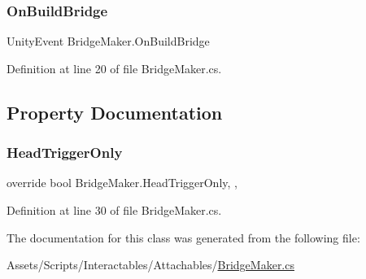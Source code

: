 \subsubsection{\texorpdfstring{On\+Build\+Bridge}{OnBuildBridge}}
{\footnotesize\ttfamily Unity\+Event Bridge\+Maker.\+On\+Build\+Bridge}



Definition at line 20 of file Bridge\+Maker.\+cs.



\subsection{Property Documentation}
\mbox{\label{class_bridge_maker_ae19669b24ef7131ae7d9bfe8fc9f72cf}} 
\subsubsection{\texorpdfstring{Head\+Trigger\+Only}{HeadTriggerOnly}}
{\footnotesize\ttfamily override bool Bridge\+Maker.\+Head\+Trigger\+Only\hspace{0.3cm}{\ttfamily [get]}, {\ttfamily [set]}, {\ttfamily [protected]}}



Definition at line 30 of file Bridge\+Maker.\+cs.



The documentation for this class was generated from the following file\+:\begin{DoxyCompactItemize}
\item 
Assets/\+Scripts/\+Interactables/\+Attachables/\mbox{\hyperlink{_bridge_maker_8cs}{Bridge\+Maker.\+cs}}\end{DoxyCompactItemize}
